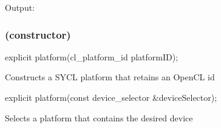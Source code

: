 \documentclass[letterpaper,10pt,english]{sphinxmanual}
\begin{document}
Output:

\begin{sphinxVerbatim}[commandchars=\\\{\}]
      
      
  
        
      
        
   
     
\end{sphinxVerbatim}


\subsubsection{(constructor)}
\label{\detokenize{programming-interface/runtime/platform:constructor}}\label{\detokenize{programming-interface/runtime/platform:platform-constructor}}
\begin{sphinxVerbatim}[commandchars=\\\{\}]
\end{sphinxVerbatim}
\begin{sphinxalltt}
explicit platform(cl\_platform\_id platformID);             \begin{footnote}[1]\sphinxAtStartFootnote
Constructs a SYCL platform that retains an OpenCL id
\end{footnote}
\end{sphinxalltt}
\begin{sphinxalltt}
explicit platform(const device\_selector \&deviceSelector); \begin{footnote}[2]\sphinxAtStartFootnote
Selects a platform that contains the desired device
\end{footnote}
\end{sphinxalltt}
\end{document}

